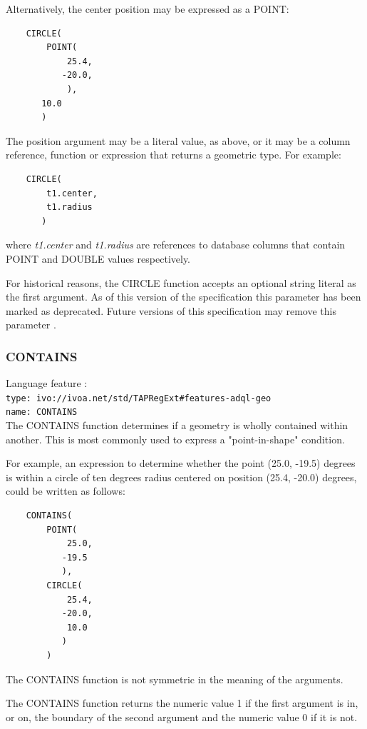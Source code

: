 \documentclass[11pt,a4paper]{ivoa}
\begin{document}
Alternatively, the center position may be expressed as a POINT:
\begin{verbatim}
    CIRCLE(
        POINT(
            25.4,
           -20.0,
            ),
       10.0
       )
\end{verbatim}

The position argument may be a literal value, as above, or it may be a
column reference, function or expression that returns a geometric type.
For example:
\begin{verbatim}
    CIRCLE(
        t1.center,
        t1.radius
       )
\end{verbatim}
where \textit{t1.center} and \textit{t1.radius} are references to
database columns that contain POINT and DOUBLE values respectively.

For historical reasons, the CIRCLE function accepts an optional string literal
as the first argument.
As of this version of the specification this parameter has been
marked as deprecated.
Future versions of this specification may remove this parameter
.

\subsubsection{CONTAINS}
\label{sec:functions.geom.contains}
{\footnotesize Language feature :}\\
{\footnotesize \verb|type: ivo://ivoa.net/std/TAPRegExt#features-adql-geo|}\\
{\footnotesize \verb|name: CONTAINS|}\\

The CONTAINS function determines if a geometry is wholly contained within
another. This is most commonly used to express a "point-in-shape" condition.

For example, an expression to determine whether the point (25.0, -19.5) degrees
is within a circle of ten degrees radius centered on position (25.4, -20.0) degrees,
could be written as follows:
\begin{verbatim}
    CONTAINS(
        POINT(
            25.0,
           -19.5
           ),
        CIRCLE(
            25.4,
           -20.0,
            10.0
           )
        )
\end{verbatim}

The CONTAINS function is not symmetric in the meaning of the arguments.

The CONTAINS function returns the numeric value 1 if the first argument
is in, or on, the boundary of the second argument and the numeric value 0
if it is not.
\end{document}
